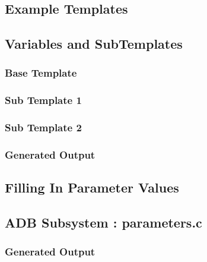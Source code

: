 \documentclass{settings/TU_Delft_Report}
\begin{document}
\begin{appendices}
\chapter{Example Templates}
\section{Variables and SubTemplates}
\subsection{Base Template}
\subsection{Sub Template 1}
\subsection{Sub Template 2}
\subsection{Generated Output}

\section{Filling In Parameter Values}

\section{ADB Subsystem : parameters.c}

\subsection{Generated Output}
\end{appendices}

\printbibliography
\end{document}

